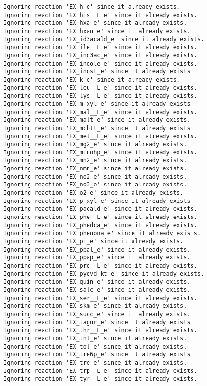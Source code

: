 \documentclass[
  letterpaper,
  DIV=11,
  numbers=noendperiod]{scrartcl}
\begin{document}
\begin{verbatim}
Ignoring reaction 'EX_h_e' since it already exists.
Ignoring reaction 'EX_his__L_e' since it already exists.
Ignoring reaction 'EX_hxa_e' since it already exists.
Ignoring reaction 'EX_hxan_e' since it already exists.
Ignoring reaction 'EX_id3acald_e' since it already exists.
Ignoring reaction 'EX_ile__L_e' since it already exists.
Ignoring reaction 'EX_ind3ac_e' since it already exists.
Ignoring reaction 'EX_indole_e' since it already exists.
Ignoring reaction 'EX_inost_e' since it already exists.
Ignoring reaction 'EX_k_e' since it already exists.
Ignoring reaction 'EX_leu__L_e' since it already exists.
Ignoring reaction 'EX_lys__L_e' since it already exists.
Ignoring reaction 'EX_m_xyl_e' since it already exists.
Ignoring reaction 'EX_mal__L_e' since it already exists.
Ignoring reaction 'EX_malt_e' since it already exists.
Ignoring reaction 'EX_mcbtt_e' since it already exists.
Ignoring reaction 'EX_met__L_e' since it already exists.
Ignoring reaction 'EX_mg2_e' since it already exists.
Ignoring reaction 'EX_minohp_e' since it already exists.
Ignoring reaction 'EX_mn2_e' since it already exists.
Ignoring reaction 'EX_nmn_e' since it already exists.
Ignoring reaction 'EX_no2_e' since it already exists.
Ignoring reaction 'EX_no3_e' since it already exists.
Ignoring reaction 'EX_o2_e' since it already exists.
Ignoring reaction 'EX_p_xyl_e' since it already exists.
Ignoring reaction 'EX_pacald_e' since it already exists.
Ignoring reaction 'EX_phe__L_e' since it already exists.
Ignoring reaction 'EX_phedca_e' since it already exists.
Ignoring reaction 'EX_phenona_e' since it already exists.
Ignoring reaction 'EX_pi_e' since it already exists.
Ignoring reaction 'EX_ppal_e' since it already exists.
Ignoring reaction 'EX_ppap_e' since it already exists.
Ignoring reaction 'EX_pro__L_e' since it already exists.
Ignoring reaction 'EX_pyovd_kt_e' since it already exists.
Ignoring reaction 'EX_quin_e' since it already exists.
Ignoring reaction 'EX_salc_e' since it already exists.
Ignoring reaction 'EX_ser__L_e' since it already exists.
Ignoring reaction 'EX_skm_e' since it already exists.
Ignoring reaction 'EX_succ_e' since it already exists.
Ignoring reaction 'EX_tagur_e' since it already exists.
Ignoring reaction 'EX_thr__L_e' since it already exists.
Ignoring reaction 'EX_tnt_e' since it already exists.
Ignoring reaction 'EX_tol_e' since it already exists.
Ignoring reaction 'EX_tre6p_e' since it already exists.
Ignoring reaction 'EX_tre_e' since it already exists.
Ignoring reaction 'EX_trp__L_e' since it already exists.
Ignoring reaction 'EX_tyr__L_e' since it already exists.

\end{verbatim}
\end{document}
